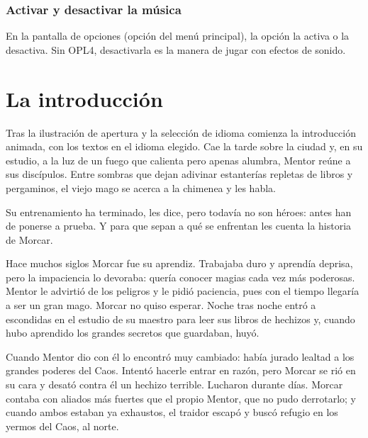 \subsection{Activar y desactivar la música}

En la pantalla de opciones (opción  del menú principal),
la opción  la activa o la desactiva. Sin OPL4, desactivarla
es la manera de jugar con efectos de sonido.

\chapter{La introducción}
\label{cap:intro}

Tras la ilustración de apertura y la selección de idioma comienza la introducción animada, con los textos en el idioma elegido. Cae la
tarde sobre la ciudad y, en su estudio, a la luz de un fuego que calienta
pero apenas alumbra, Mentor reúne a sus discípulos. Entre sombras que dejan
adivinar estanterías repletas de libros y pergaminos, el viejo mago se
acerca a la chimenea y les habla.


Su entrenamiento ha terminado, les dice, pero todavía no son héroes: antes
han de ponerse a prueba. Y para que sepan a qué se enfrentan les cuenta la
historia de Morcar.

Hace muchos siglos Morcar fue su aprendiz. Trabajaba duro y aprendía
deprisa, pero la impaciencia lo devoraba: quería conocer magias cada vez
más poderosas. Mentor le advirtió de los peligros y le pidió paciencia,
pues con el tiempo llegaría a ser un gran mago. Morcar no quiso esperar.
Noche tras noche entró a escondidas en el estudio de su maestro para leer
sus libros de hechizos y, cuando hubo aprendido los grandes secretos que
guardaban, huyó.


Cuando Mentor dio con él lo encontró muy cambiado: había jurado lealtad a
los grandes poderes del Caos. Intentó hacerle entrar en razón, pero Morcar
se rió en su cara y desató contra él un hechizo terrible. Lucharon durante
días. Morcar contaba con aliados más fuertes que el propio Mentor, que no
pudo derrotarlo; y cuando ambos estaban ya exhaustos, el traidor escapó y
buscó refugio en los yermos del Caos, al norte.

